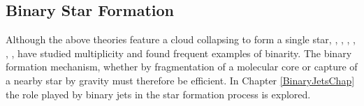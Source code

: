 \subsection{Binary Star Formation}
Although the above theories feature a cloud collapsing to form a single star, 
\citet{1991A&A...248..485D},
\citet{1992ASPC...32...73M},
\citet{1992ASPC...32...50Z},
\citet{1993AJ....106.2005G},
\citet{1995ApJ...443..625S},
\citet{1999NewA....4..531P}, have studied multiplicity and found frequent examples of binarity. 
The binary formation mechanism, whether by fragmentation of a molecular core or capture of a nearby star by gravity must therefore be efficient.
In Chapter \ref{BinaryJetsChap} the role played by binary jets in the star formation process is explored.



